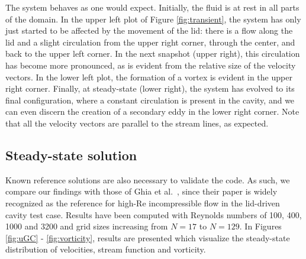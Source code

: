 \documentclass[final,3p,twocolumn]{elsarticle}
\begin{document}
The system behaves as one would expect. Initially, the fluid is at rest in all
parts of the domain. In the upper left plot of Figure \ref{fig:transient}, the
system has only just started to be affected by the movement of the lid: there
is a flow along the lid and a slight circulation from the upper right corner,
through the center, and back to the upper left corner. In the next snapshot
(upper right), this circulation has become more pronounced, as is evident from
the relative size of the velocity vectors. In the lower left plot, the
formation of a vortex is evident in the upper right corner. Finally, at
steady-state (lower right), the system has evolved to its final configuration,
where a constant circulation is present in the cavity, and we can even discern
the creation of a secondary eddy in the lower right corner. Note that all the
velocity vectors are parallel to the stream lines, as expected. 

\subsection{Steady-state solution}
\label{subsec:steady}

Known reference solutions are also necessary to validate the code. As
such, we compare our findings with those of Ghia et al.\ \cite{ghia1982high},
since their paper is widely recognized as the reference for high-Re
incompressible flow in the lid-driven cavity test case. Results have been
computed with Reynolds numbers of 100, 400, 1000 and 3200 and grid sizes
increasing from $N=17$ to $N=129$. In Figures \ref{fig:uGC} -
\ref{fig:vorticity}, results are presented which visualize the steady-state
distribution of velocities, stream function and vorticity. 
\end{document}
